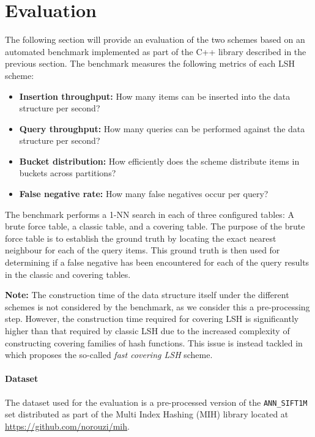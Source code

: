 \section{Evaluation}
\label{evaluation}

The following section will provide an evaluation of the two schemes based on an automated benchmark implemented as part of the C++ library described in the previous section. The benchmark measures the following metrics of each LSH scheme:

\begin{itemize}
  \item \textbf{Insertion throughput:} How many items can be inserted into the data structure per second?
  \item \textbf{Query throughput:} How many queries can be performed against the data structure per second?
  \item \textbf{Bucket distribution:} How efficiently does the scheme distribute items in buckets across partitions?
  \item \textbf{False negative rate:} How many false negatives occur per query?
\end{itemize}

The benchmark performs a 1-NN search in each of three configured tables: A brute force table, a classic table, and a covering table. The purpose of the brute force table is to establish the ground truth by locating the exact nearest neighbour for each of the query items. This ground truth is then used for determining if a false negative has been encountered for each of the query results in the classic and covering tables.

\textbf{Note:} The construction time of the data structure itself under the different schemes is not considered by the benchmark, as we consider this a pre-processing step. However, the construction time required for covering LSH is significantly higher than that required by classic LSH due to the increased complexity of constructing covering families of hash functions. This issue is instead tackled in \cite{DBLP:journals/corr/PhamP16} which proposes the so-called \textit{fast covering LSH} scheme.

\paragraph{Dataset} The dataset used for the evaluation is a pre-processed version of the \texttt{ANN\_SIFT1M} set distributed as part of the Multi Index Hashing (MIH) library located at \url{https://github.com/norouzi/mih}.

